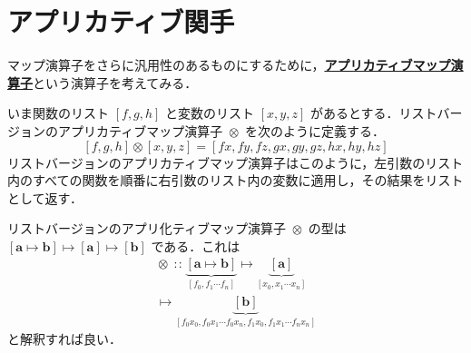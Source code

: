 \documentclass[a4paper,twocolumn]{jsbook}
\def\[{\left[\!\left[}
\def\]{\right]\!\right]}
\newcommand{\programminglanguage}[1]{\textsf{#1}}
\newcommand{\haskell}{\programminglanguage{Haskell}}
\newcommand{\keyword}[1]{{\underline{\textbf{#1}}}}
\newcommand{\code}[1]{\texttt{#1}}
\DeclareMathOperator{\mAppMapList}{\otimes}
\DeclareMathOperator{\mIn}{{:\!:}}
\DeclareMathOperator{\mMap}{\bullet}
\DeclareMathOperator{\mMapList}{\odot}
\DeclareMathOperator{\mMapMaybe}{\boxdot}
\DeclareMathOperator{\mMapsTo}{\mapsto}
\newcommand{\mType}[1]{\mathbf{#1}}
\newcommand{\mListType}[1]{[\mType{#1}]}
\newcommand{\mTypeConstructor}[1]{\textit{#1}}
\newcommand{\mGenericTypeAssemble}[2]{{}^{\mTypeConstructor{#1}}\[\mType{#2}\]}
\newcommand{\mMaybeType}[1]{\mGenericTypeAssemble{Maybe}{#1}}
\newcommand{\mListWith}[1]{\left[#1\right]}
\newcommand{\mGenericTypeClass}[1]{\textsc{#1}} %
\newcommand{\mFunctorTypeClass}{\mGenericTypeClass{Functor}}
\newcommand{\mList}[1]{{#1}^\mathrm{\star}}
\newcommand{\mMaybe}[1]{{#1}^?}
\newcommand{\mProj}[2]{#1\mMapsTo#2}
\begin{document}





\section{アプリカティブ関手}

マップ演算子をさらに汎用性のあるものにするために，\keyword{アプリカティブマップ演算子}という演算子を考えてみる．

いま関数のリスト $\mListWith{f,g,h}$ と変数のリスト $\mListWith{x,y,z}$ があるとする．リストバージョンのアプリカティブマップ演算子 $\mAppMapList$ を次のように定義する．
\begin{equation}
\mListWith{f,g,h}\mAppMapList\mListWith{x,y,z}
=\mListWith{fx,fy,fz,gx,gy,gz,hx,hy,hz}
\end{equation}
リストバージョンのアプリカティブマップ演算子はこのように，左引数のリスト内のすべての関数を順番に右引数のリスト内の変数に適用し，その結果をリストとして返す．

リストバージョンのアプリ化ティブマップ演算子 $\mAppMapList$ の型は $\mProj{\mListType{\mProj{\mType{a}}{\mType{b}}}}{\mProj{\mListType{\mType{a}}}{\mListType{\mType{b}}}}$ である．これは
\begin{multline}
\mAppMapList\mIn
\underbrace{\mListWith{\mType{a}\mapsto\mType{b}}}_{\mListWith{f_0,f_1\dotsb f_n}}
\mapsto
\underbrace{\mListType{a}}_{\mListWith{x_0,x_1\dotsb x_n}}\\
\mapsto
\underbrace{\mListType{\mType{b}}}_{\mListWith{f_0x_0,f_0x_1\dotsb f_0x_n,f_1x_0,f_1x_1\dotsb f_nx_n}}
\end{multline}
と解釈すれば良い．
\end{document}

